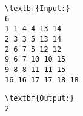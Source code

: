 \begin{verbatim}
\textbf{Input:}
6
1 1 4 4 13 14
2 3 3 5 13 14
2 6 7 5 12 12
9 6 7 10 10 15
9 8 8 11 11 15
16 16 17 17 18 18 \end{verbatim}
\begin{verbatim}
\textbf{Output:}
2\end{verbatim}